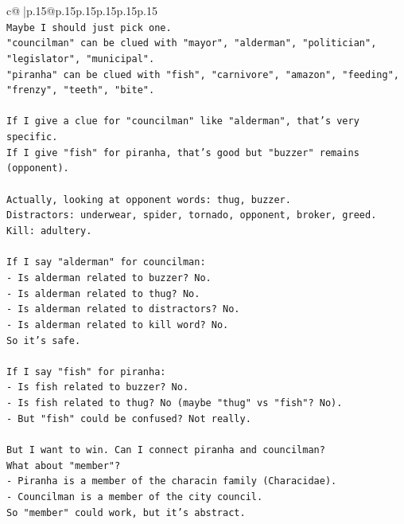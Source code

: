 \documentclass{article}
\begin{document}
{\begin{supertabular}{c@{$\;$}|p{.15\linewidth}@{}p{.15\linewidth}p{.15\linewidth}p{.15\linewidth}p{.15\linewidth}p{.15\linewidth}}
{{{\\ 
\texttt{Maybe I should just pick one.} \\
\texttt{"councilman" can be clued with "mayor", "alderman", "politician", "legislator", "municipal".} \\
\texttt{"piranha" can be clued with "fish", "carnivore", "amazon", "feeding", "frenzy", "teeth", "bite".} \\
\\ 
\texttt{If I give a clue for "councilman" like "alderman", that's very specific.} \\
\texttt{If I give "fish" for piranha, that's good but "buzzer" remains (opponent).} \\
\\ 
\texttt{Actually, looking at opponent words: thug, buzzer.} \\
\texttt{Distractors: underwear, spider, tornado, opponent, broker, greed.} \\
\texttt{Kill: adultery.} \\
\\ 
\texttt{If I say "alderman" for councilman:} \\
\texttt{{-} Is alderman related to buzzer? No.} \\
\texttt{{-} Is alderman related to thug? No.} \\
\texttt{{-} Is alderman related to distractors? No.} \\
\texttt{{-} Is alderman related to kill word? No.} \\
\texttt{So it's safe.} \\
\\ 
\texttt{If I say "fish" for piranha:} \\
\texttt{{-} Is fish related to buzzer? No.} \\
\texttt{{-} Is fish related to thug? No (maybe "thug" vs "fish"? No).} \\
\texttt{{-} But "fish" could be confused? Not really.} \\
\\ 
\texttt{But I want to win. Can I connect piranha and councilman?} \\
\texttt{What about "member"?} \\
\texttt{{-} Piranha is a member of the characin family (Characidae).} \\
\texttt{{-} Councilman is a member of the city council.} \\
\texttt{So "member" could work, but it's abstract.} \\
\\ 
}}}
\end{supertabular}}
\end{document}
